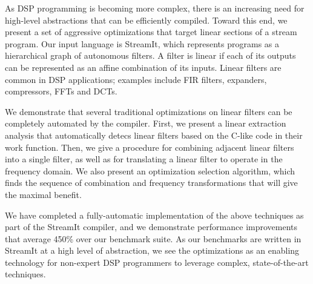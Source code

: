 As DSP programming is becoming more complex, there is an increasing
need for high-level abstractions that can be efficiently compiled.
Toward this end, we present a set of aggressive optimizations that
target linear sections of a stream program.  Our input language is
StreamIt, which represents programs as a hierarchical graph of
autonomous filters.  A filter is linear if each of its outputs can be
represented as an affine combination of its inputs.  Linear filters
are common in DSP applications; examples include FIR filters,
expanders, compressors, FFTs and DCTs.

We demonstrate that several traditional optimizations on linear
filters can be completely automated by the compiler.  First, we
present a linear extraction analysis that automatically detecs linear
filters based on the C-like code in their work function.  Then, we
give a procedure for combining adjacent linear filters into a single
filter, as well as for translating a linear filter to operate in the
frequency domain.  We also present an optimization selection
algorithm, which finds the sequence of combination and frequency
transformations that will give the maximal benefit.

We have completed a fully-automatic implementation of the above
techniques as part of the StreamIt compiler, and we demonstrate
performance improvements that average 450\% over our benchmark suite.
As our benchmarks are written in StreamIt at a high level of
abstraction, we see the optimizations as an enabling technology for
non-expert DSP programmers to leverage complex, state-of-the-art
techniques.

